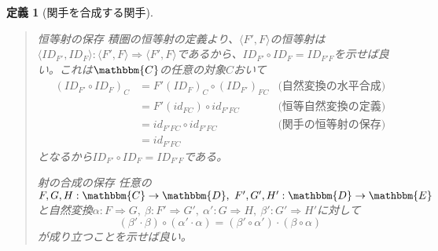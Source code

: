 \documentclass[uplatex,dvipdfmx]{jsarticle}
\newcommand{\cat}[1]{\mathbbm{#1}}
\newcommand{\arrow}{\rightarrow}
\newcommand{\functor}[3]{#1:\cat{#2}\arrow \cat{#3}}
\newcommand{\nat}[3]{#1:#2\Rightarrow #3}
\newcommand{\tuple}[1]{\langle #1\rangle}
\newtheorem{define}[proof]{定義}
\numberwithin{proof}{subsection}
\newenvironment{mydescription}
{\begin{description}
  \setlength{\parskip}{0.5cm}
}
{\end{description}}
\begin{document}
\begin{define}[関手を合成する関手]
\begin{quote}
\begin{mydescription}
\begin{center}
\begin{tikzpicture}[auto]
      \end{tikzpicture}
    \end{center}
		\item[恒等射の保存]積圏の恒等射の定義より、$\tuple{F',F}$の恒等射は$\nat{\tuple{ID_{F'},ID_{F}}}{\tuple{F',F}}{\tuple{F',F}}$であるから、$ID_{F'}\circ ID_{F}=ID_{F'F}$を示せば良い。これは$\cat{C}$の任意の対象$C$おいて
    \begin{align*}
      (ID_{F'}\circ ID_F)_C &= F'(ID_{F})_C\circ (ID_{F'})_{FC}&\text{(自然変換の水平合成)}\\
      &=F'(id_{FC})\circ id_{F'FC}&\text{(恒等自然変換の定義)}\\
      &=id_{F'FC}\circ id_{F'FC}&\text{(関手の恒等射の保存)}\\
      &=id_{F'FC}
    \end{align*}
    となるから$ID_{F'}\circ ID_{F}=ID_{F'F}$である。
		\item[射の合成の保存]任意の$\functor{F,G,H}{C}{D},\ \functor{F',G',H'}{D}{E}$と自然変換$\nat{\alpha}{F}{G},\ \nat{\beta}{F'}{G'},\ \nat{\alpha'}{G}{H},\ \nat{\beta'}{G'}{H'}$に対して
    \[(\beta'\cdot\beta)\circ(\alpha'\cdot\alpha)=(\beta'\circ\alpha')\cdot(\beta\circ\alpha)\]が成り立つことを示せば良い。
    \begin{center}
\end{center}
\end{mydescription}
\end{quote}
\end{define}
\end{document}
